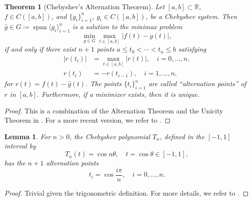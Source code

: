 \documentclass[a4paper]{article}
\DeclareMathOperator{\spn}{span}
\theoremstyle{plain}
\newtheorem{theorem}{Theorem}[section]
\newtheorem{lemma}{Lemma}[section]
\theoremstyle{definition}
\theoremstyle{remark}
\begin{document}
\begin{theorem}[Chebyshev's Alternation Theorem]\label{thm:alternation}
	Let \([a, b] \subset \mathbb{R}\), \(f \in C([a, b])\), and \(\{g_i\}_{i=1}^n\), \(g_i \in C([a, b])\), be a Chebyshev system. Then \(\hat{g} \in G \coloneqq \spn\langle g_i \rangle_{i=1}^n\) is a solution to the minimax problem
	\begin{equation*}
		\min_{g \in G} \max_{t\in [a,b]} |f(t) - g(t)|,
	\end{equation*}
	if and only if there exist \(n + 1\) points \(a \leq t_0 < \cdots < t_n \leq b\) satisfying
	\begin{align*}
		|r(t_i)| &= \max_{t\in [a,b]} |r(t)|, \quad i = 0,\dots,n,\\
		r(t_i) &= -r(t_{i-1}), \quad i = 1,\dots,n,
	\end{align*}
	for \(r(t) = f(t) - \hat{g}(t)\). The points \(\{t_i\}_{i=1}^n\) are called ``alternation points'' of \(r\) in \([a, b]\). Furthermore, if a minimizer exists, then it is unique.
\end{theorem}
\begin{proof}
	This is a combination of the Alternation Theorem and the Unicity Theorem in \cite{Cheney1998}. For a more recent version, we refer to \cite{Alimov2021}.
\end{proof}

\begin{lemma}
	For \(n > 0\), the Chebyshev polynomial \(T_n\), defined in the \([-1,1]\) interval by
	\begin{equation*}
		T_n(t) = \cos n\theta, \quad t = \cos \theta \in [-1,1],
	\end{equation*}	
	has the \(n + 1\) alternation points
	\begin{equation*}
		t_i = \cos \frac{i\pi}{n}, \quad i = 0,\dots,n.
	\end{equation*}
\end{lemma}
\begin{proof}
	Trivial given the trigonometric definition. For more details, we refer to \cite{Mason2002}.
\end{proof}
\end{document}
